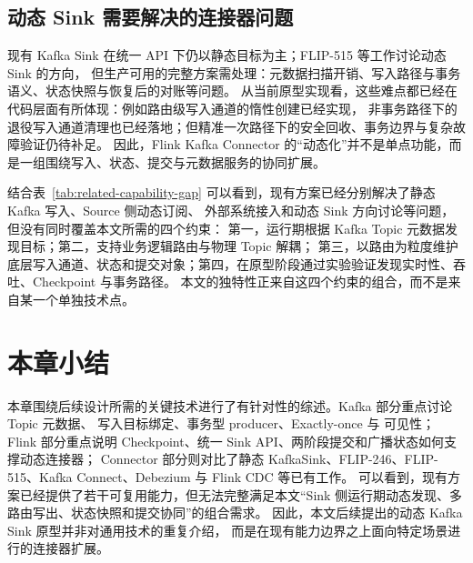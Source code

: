 \subsection{动态 Sink 需要解决的连接器问题}

现有 Kafka Sink 在统一 API 下仍以静态目标为主；FLIP-515\cite{flip515} 等工作讨论动态 Sink 的方向，
但生产可用的完整方案需处理：元数据扫描开销、写入路径与事务语义、状态快照与恢复后的对账等问题。
从当前原型实现看，这些难点都已经在代码层面有所体现：例如路由级写入通道的惰性创建已经实现，
非事务路径下的退役写入通道清理也已经落地；但精准一次路径下的安全回收、事务边界与复杂故障验证仍待补足。
因此，Flink Kafka Connector 的“动态化”并不是单点功能，而是一组围绕写入、状态、提交与元数据服务的协同扩展。

结合表~\ref{tab:related-capability-gap} 可以看到，现有方案已经分别解决了静态 Kafka 写入、Source 侧动态订阅、
外部系统接入和动态 Sink 方向讨论等问题，但没有同时覆盖本文所需的四个约束：
第一，运行期根据 Kafka Topic 元数据发现目标；第二，支持业务逻辑路由与物理 Topic 解耦；
第三，以路由为粒度维护底层写入通道、状态和提交对象；第四，在原型阶段通过实验验证发现实时性、吞吐、Checkpoint 与事务路径。
本文的独特性正来自这四个约束的组合，而不是来自某一个单独技术点。

\section{本章小结}

本章围绕后续设计所需的关键技术进行了有针对性的综述。Kafka 部分重点讨论 Topic 元数据、
写入目标绑定、事务型 producer、Exactly-once 与  可见性；
Flink 部分重点说明 Checkpoint、统一 Sink API、两阶段提交和广播状态如何支撑动态连接器；
Connector 部分则对比了静态 KafkaSink、FLIP-246、FLIP-515、Kafka Connect、Debezium 与 Flink CDC 等已有工作。
可以看到，现有方案已经提供了若干可复用能力，但无法完整满足本文“Sink 侧运行期动态发现、多路由写出、状态快照和提交协同”的组合需求。
因此，本文后续提出的动态 Kafka Sink 原型并非对通用技术的重复介绍，
而是在现有能力边界之上面向特定场景进行的连接器扩展。
